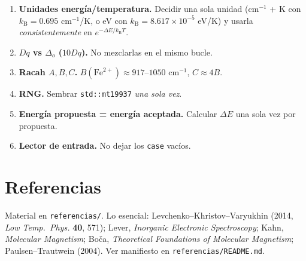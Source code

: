 \documentclass[11pt,a4paper]{article}
\newcommand{\Dq}{Dq}
\newcommand{\kb}{k_{\mathrm{B}}}
\begin{document}
\begin{enumerate}
\item \textbf{Unidades energía/temperatura.} Decidir una sola unidad (cm$^{-1}$ +
  K con $\kb=0.695$ cm$^{-1}$/K, o eV con $\kb=8.617\times10^{-5}$ eV/K) y usarla
  \emph{consistentemente} en $e^{-\Delta E/\kb T}$.
\item \textbf{$\Dq$ vs $\Delta_o$ ($10\Dq$).} No mezclarlas en el mismo bucle.
\item \textbf{Racah $A,B,C$.} $B(\mathrm{Fe}^{2+})\approx 917$--$1050$ cm$^{-1}$,
  $C\approx 4B$.
\item \textbf{RNG.} Sembrar \texttt{std::mt19937} \emph{una sola vez}.
\item \textbf{Energía propuesta = energía aceptada.} Calcular $\Delta E$ una sola
  vez por propuesta.
\item \textbf{Lector de entrada.} No dejar los \texttt{case} vacíos.
\end{enumerate}

\section{Referencias}

Material en \texttt{referencias/}. Lo esencial:
Levchenko--Khristov--Varyukhin (2014, \emph{Low Temp.\ Phys.} \textbf{40}, 571);
Lever, \emph{Inorganic Electronic Spectroscopy}; Kahn, \emph{Molecular Magnetism};
Boča, \emph{Theoretical Foundations of Molecular Magnetism}; Paulsen--Trautwein
(2004). Ver manifiesto en \texttt{referencias/README.md}.
\end{document}
